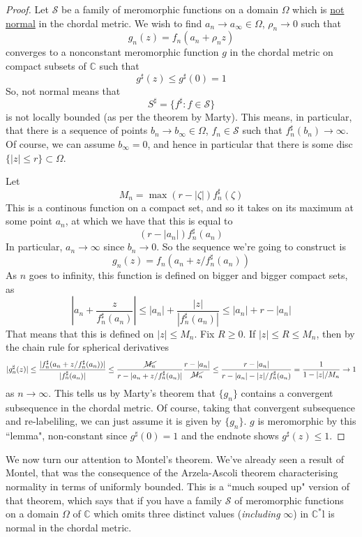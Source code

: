 \documentclass{article}
\newcommand{\mbb}[1]{\mathbb{#1}}
\newcommand{\mc}[1]{\mathcal{#1}}
\begin{document}
\begin{proof}
Let \(\mc{S}\) be a family of meromorphic functions on a domain \(\Omega\) which is \underline{not normal} in the chordal metric. We wish to find \(a_n \to a_\infty \in \Omega\), \(\rho_n \to 0\) such that
\[g_n(z) = f_n(a_n + \rho_n z)\]
converges to a nonconstant meromorphic function \(g\) in the chordal metric on compact subsets of \(\mbb{C}\) such that
\[g^\sharp(z) \leq g^\sharp(0) = 1\]
So, not normal means that
\[S^\sharp = \{f^\sharp: f \in \mc{S}\}\]
is not locally bounded (as per the theorem by Marty). This means, in particular, that there is a sequence of points \(b_n \to b_\infty \in \Omega\), \(f_n \in \mc{S}\) such that \(f_n^\sharp(b_n) \to \infty\). Of course, we can assume \(b_\infty = 0\), and hence in particular that there is some disc \(\{|z| \leq r\} \subset \Omega\).

Let
\[M_n = \max(r - |\zeta|)f_n^\sharp(\zeta)\]
This is a continous function on a compact set, and so it takes on its maximum at some point \(a_n\), at which we have that this is equal to
\[(r - |a_n|)f_n^\sharp(a_n)\]
In particular, \(a_n \to \infty\) since \(b_n \to 0\). So the sequence we're going to construct is
\[g_n(z) = f_n(a_n + z/f_n^\sharp(a_n))\]
As \(n\) goes to infinity, this function is defined on bigger and bigger compact sets, as
\[\left|a_n + \frac{z}{f_n^\sharp(a_n)}\right| \leq |a_n| + \frac{|z|}{|f_n^\sharp(a_n)|} \leq |a_n| + r - |a_n|\]
That means that this is defined on \(|z| \leq M_n\). Fix \(R \geq 0\). If \(|z| \leq R \leq M_n\), then by the chain rule for spherical derivatives
\[|g_n^\sharp(z)| \leq \frac{|f_n^\sharp(a_n + z/f_n^\sharp(a_n))|}{|f_n^\sharp(a_n)|} \leq \frac{\cancel{M_n}}{r - |a_n + z/f_n^\sharp(a_n)|}\frac{r - |a_n|}{\cancel{M_n}} \leq \frac{r - |a_n|}{r - |a_n| - |z|/f_n^\sharp(a_n)} = \frac{1}{1  - |z|/M_n} \to 1\]
as \(n \to \infty\). This tells us by Marty's theorem that \(\{g_n\}\) contains a convergent subsequence in the chordal metric. Of course, taking that convergent subsequence and re-labeliling, we can just assume it is given by \(\{g_n\}\). \(g\) is meromorphic by this ``lemma", non-constant since \(g^\sharp(0) = 1\) and the endnote shows \(g^\sharp(z) \leq 1\).
\end{proof}

We now turn our attention to Montel's theorem. We've already seen a result of Montel, that was the consequence of the Arzela-Ascoli theorem characterising normality in terms of uniformly bounded. This is a ``much souped up" version of that theorem, which says that if you have a family \(\mc{S}\) of meromorphic functions on a domain \(\Omega\) of \(\mbb{C}\) which omits three distinct values (\textit{including} \(\infty\)) in \(\mbb{C}^*\)l is normal in the chordal metric.
\end{document}
